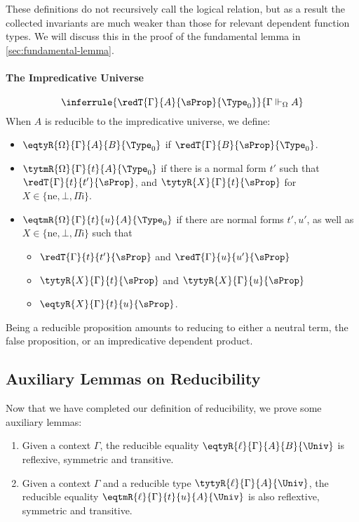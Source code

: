 These definitions do not recursively call the logical relation,
but as a result the collected invariants are
much weaker than those for relevant dependent function
types. We will discuss this in the proof of the fundamental lemma in \cref{sec:fundamental-lemma}.

\paragraph{The Impredicative Universe}
\[
  \inferrule{\redT{\Gamma}{A}{\sProp}{\Type_0}}
            {\Gamma \Vdash_{\Omega} A}
\]
When $A$ is reducible to the impredicative universe, we define:
\begin{itemize}
  \item \( \eqtyR{\Omega}{\Gamma}{A}{B}{\Type_0} \) if \( \redT{\Gamma}{B}{\sProp}{\Type_0} \).
  \item \( \tytmR{\Omega}{\Gamma}{t}{A}{\Type_0} \) if there is a normal form \( t' \) such that
    \( \redT{\Gamma}{t}{t'}{\sProp} \), and \( \tytyR{X}{\Gamma}{t}{\sProp} \) for
    \( X \in \{ \mathrm{ne}, \bot, {\Pi \mathsf{i}}\} \).
  \item \( \eqtmR{\Omega}{\Gamma}{t}{u}{A}{\Type_0} \) if there are normal forms \( t', u' \), as well
  as \( X \in \{ \mathrm{ne}, \bot, {\Pi \mathsf{i}}\} \) such that
    \begin{itemize}
    \item \( \redT{\Gamma}{t}{t'}{\sProp} \) and \( \redT{\Gamma}{u}{u'}{\sProp} \)
    \item \( \tytyR{X}{\Gamma}{t}{\sProp} \) and \( \tytyR{X}{\Gamma}{u}{\sProp} \)
    \item  \( \eqtyR{X}{\Gamma}{t}{u}{\sProp} \).
    \end{itemize}
\end{itemize}
Being a reducible proposition amounts to reducing to either a neutral term,
the false proposition, or an impredicative dependent product.

\subsection{Auxiliary Lemmas on Reducibility}

Now that we have completed our definition of reducibility, we prove
some auxiliary lemmas:

\begin{lemma} \phantom{a}
  \begin{enumerate}
  \item Given a context \( \Gamma \), the reducible equality \( \eqtyR{\ell}{\Gamma}{A}{B}{\Univ} \) is
  reflexive, symmetric and transitive. 
  \item Given a context \( \Gamma \) and a reducible type
  \( \tytyR{\ell}{\Gamma}{A}{\Univ} \), the reducible equality \( \eqtmR{\ell}{\Gamma}{t}{u}{A}{\Univ} \)
  is also reflextive, symmetric and transitive.
  \end{enumerate}
\end{lemma}

